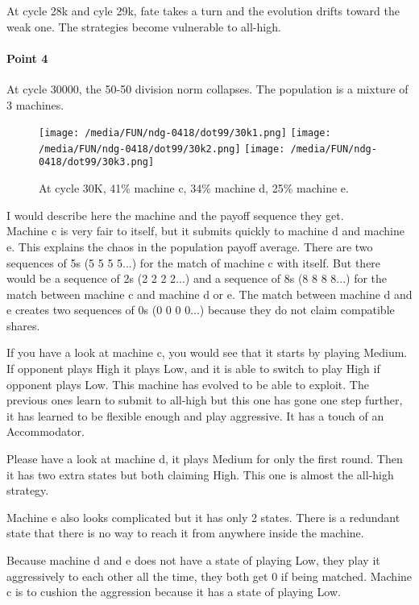 \documentclass[12.5pt]{report}
\begin{document}
At cycle 28k and cyle 29k, fate takes a turn and the evolution drifts toward the weak one. The strategies become vulnerable to all-high.

\paragraph{Point 4}

At cycle 30000, the 50-50 division norm collapses. The population is a mixture of 3 machines.

\begin{figure}[h!]
\center
\texttt{[image: /media/FUN/ndg-0418/dot99/30k1.png]}
\texttt{[image: /media/FUN/ndg-0418/dot99/30k2.png]}
\texttt{[image: /media/FUN/ndg-0418/dot99/30k3.png]}
\caption{At cycle 30K, 41\% machine c, 34\% machine d, 25\% machine e.}
\end{figure}

I would describe here the machine and the payoff sequence they get. \\

Machine c is very fair to itself, but it submits quickly to machine d and machine e. This explains the chaos in the population payoff average. There are two sequences of 5s (5 5 5 5...) for the match of machine c with itself. But there would be a sequence of 2s (2 2 2 2...) and a sequence of 8s (8 8 8 8...) for the match between machine c and machine d or e. The match between machine d and e creates two sequences of 0s (0 0 0 0...) because they do not claim compatible shares.

If you have a look at machine c, you would see that it starts by playing Medium. If opponent plays High it plays Low, and it is able to switch to play High if opponent plays Low. This machine has evolved to be able to exploit. The previous ones learn to submit to all-high but this one has gone one step further, it has learned to be flexible enough and play aggressive. It has a touch of an Accommodator.

Please have a look at machine d, it plays Medium for only the first round. Then it has two extra states but both claiming High. This one is almost the all-high strategy.

Machine e also looks complicated but it has only 2 states. There is a redundant state that there is no way to reach it from anywhere inside the machine.

Because machine d and e does not have a state of playing Low, they play it aggressively to each other all the time, they both get 0 if being matched. Machine c is to cushion the aggression because it has a state of playing Low.
\end{document}

